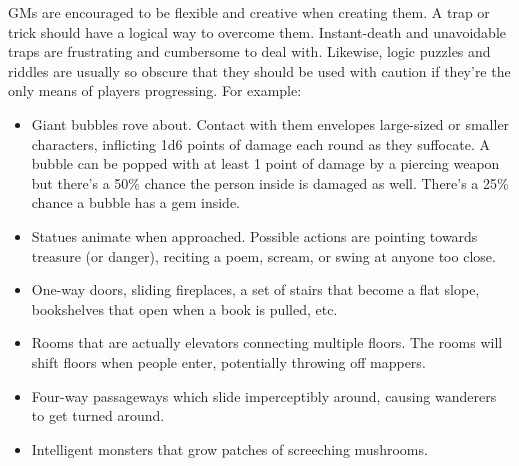 \begin{multicols}{2}
GMs are encouraged to be flexible and creative when creating them.  A trap or trick should have a logical way to overcome them.  Instant-death and unavoidable traps are frustrating and cumbersome to deal with.  Likewise, logic puzzles and riddles are usually so obscure that they should be used with caution if they're the only means of players progressing.  For example:

\begin{itemize}

\item Giant bubbles rove about.  Contact with them envelopes large-sized or smaller characters, inflicting 1d6 points of damage each round as they suffocate.  A bubble can be popped with at least 1 point of damage by a piercing weapon but there's a 50\% chance the person inside is damaged as well.  There's a 25\% chance a bubble has a gem inside.

\item Statues animate when approached.  Possible actions are pointing towards treasure (or danger), reciting a poem, scream, or swing at anyone too close.

\item One-way doors, sliding fireplaces, a set of stairs that become a flat slope, bookshelves that open when a book is pulled, etc.

\item Rooms that are actually elevators connecting multiple floors.  The rooms will shift floors when people enter, potentially throwing off mappers.

\item Four-way passageways which slide imperceptibly around, causing wanderers to get turned around.

\item Intelligent monsters that grow patches of screeching mushrooms.

\end{itemize}


\end{multicols}
